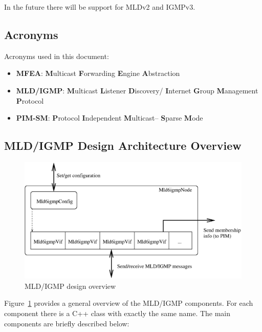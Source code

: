 \documentclass[11pt]{article}
\begin{document}
In the future there will be support for MLDv2 and IGMPv3.

\subsection{Acronyms}

Acronyms used in this document:

\begin{itemize}

  \item {\bf MFEA}: {\bf M}ulticast {\bf F}orwarding {\bf E}ngine
  {\bf A}bstraction

  \item {\bf MLD/IGMP}: {\bf M}ulticast {\bf L}istener {\bf D}iscovery/{\bf
  I}nternet {\bf G}roup {\bf M}anagement {\bf P}rotocol

  \item {\bf PIM-SM}: {\bf P}rotocol {\bf I}ndependent {\bf M}ulticast--{\bf
  S}parse {\bf M}ode

\end{itemize}


\subsection{MLD/IGMP Design Architecture Overview}

\begin{figure}[htbp]
  \begin{center}
    \includegraphics[scale=0.7]{figs/mld6igmp_design_overview}
    \caption{MLD/IGMP design overview}
    \label{fig:mld6igmp_design_overview}
  \end{center}
\end{figure}

Figure~\ref{fig:mld6igmp_design_overview} provides a general overview of the
MLD/IGMP components. For each component there is a C++ class with exactly
the same name. The main components are briefly described below:
\end{document}
